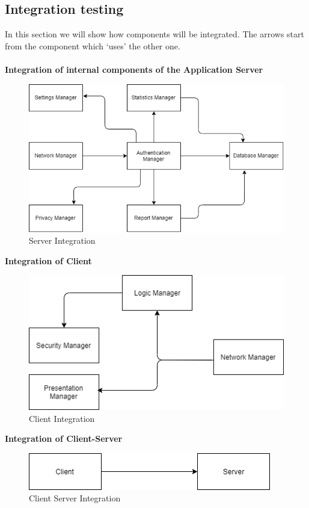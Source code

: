 \documentclass{article}
\begin{document}
\subsection{Integration testing}
In this section we will show how components will be integrated. The arrows start from the component which ‘uses’ the other one. 
\\
\\
\textbf{Integration of internal components of the Application Server}
\begin{figure}[H]
    \centering
    \includegraphics[scale=0.5]{img/integration/Server_test.png}
    \caption{Server Integration}
\end{figure}

\textbf{Integration of Client}
\begin{figure}[H]
    \centering
    \includegraphics[scale=0.5]{img/integration/Client_test.png}
    \caption{Client Integration}
\end{figure}

\textbf{Integration of Client-Server}
\begin{figure}[H]
    \centering
    \includegraphics[scale=0.5]{img/integration/ClientServer_test.png}
    \caption{Client Server Integration}
\end{figure}
\end{document}
